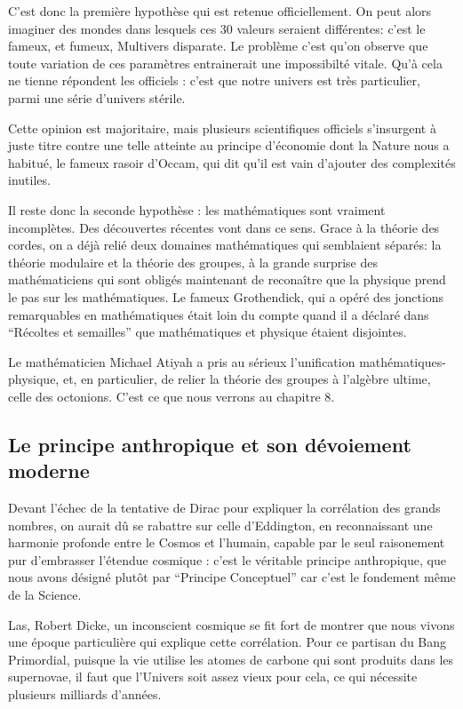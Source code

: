 \documentclass[a4paper,12pt]{article}
\begin{document}
C'est donc la première hypothèse qui est retenue officiellement. On peut alors imaginer des mondes dans lesquels ces 30 valeurs seraient différentes: c'est le fameux, et fumeux, Multivers disparate. Le problème c'est qu'on observe que toute variation de ces paramètres entrainerait une impossibilté vitale. Qu'à cela ne tienne répondent les officiels : c'est que notre univers est très particulier, parmi une série d'univers stérile.

Cette opinion est majoritaire, mais plusieurs scientifiques officiels s'insurgent à juste titre contre une telle atteinte au principe d'économie dont la Nature nous a habitué, le fameux rasoir d'Occam, qui dit qu'il est vain d'ajouter des complexités inutiles. 

Il reste donc la seconde hypothèse : les mathématiques sont vraiment incomplètes. Des découvertes récentes vont dans ce sens. Grace à la théorie des cordes, on a déjà relié deux domaines mathématiques qui semblaient séparés: la théorie modulaire et la théorie des groupes, à la grande surprise des mathématiciens qui sont obligés maintenant de reconaître que la physique prend le pas sur les mathématiques. Le fameux Grothendick, qui a opéré des jonctions remarquables en mathématiques était loin du compte quand il a déclaré dans ``Récoltes et semailles'' que mathématiques et physique étaient disjointes.

Le mathématicien Michael Atiyah a pris au sérieux l'unification mathématiques-physique, et, en particulier, de relier la théorie des groupes à l'algèbre ultime, celle des octonions. C'est ce que nous verrons au chapitre 8. 


\subsection{Le principe anthropique et son dévoiement moderne}
 
Devant l'échec de la tentative de Dirac pour expliquer la corrélation des grands nombres, on aurait dû se rabattre sur celle d'Eddington, en reconnaissant une harmonie profonde entre le Cosmos et l'humain, capable par le seul raisonement pur d'embrasser l'étendue cosmique : c'est le véritable principe anthropique, que nous avons désigné plutôt par ``Principe Conceptuel'' car c'est le fondement m\^eme de la Science. 


Las, Robert Dicke, un inconscient cosmique  se fit fort de montrer que nous vivons une époque particulière qui explique cette corrélation. Pour ce partisan du Bang Primordial, puisque la vie utilise les atomes de carbone qui sont produits dans les supernovae, il faut que l'Univers soit assez vieux pour cela, ce qui nécessite plusieurs milliards d'années.
\end{document}

